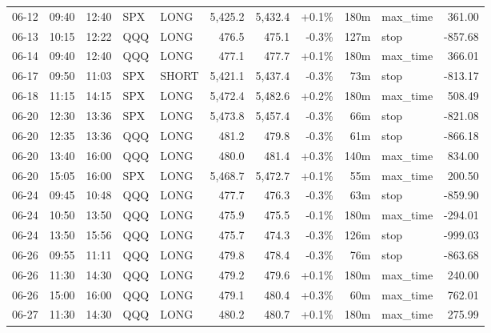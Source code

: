 \documentclass[11pt,a4paper,twoside]{article}
\begin{document}
\begin{center}
\begin{longtable}{>{\color{txtmain}}l l l l l r r r r >{\color{txtmain}}l r}
06-12 & 09:40 & 12:40 & SPX & LONG & 5,425.2 & 5,432.4 & \textcolor{wingreen}{+0.1\%} & 180m & max\_time & \textcolor{wingreen}{361.00} \\
06-13 & 10:15 & 12:22 & QQQ & LONG & 476.5 & 475.1 & \textcolor{lossred}{-0.3\%} & 127m & stop & \textcolor{lossred}{-857.68} \\
06-14 & 09:40 & 12:40 & QQQ & LONG & 477.1 & 477.7 & \textcolor{wingreen}{+0.1\%} & 180m & max\_time & \textcolor{wingreen}{366.01} \\
06-17 & 09:50 & 11:03 & SPX & SHORT & 5,421.1 & 5,437.4 & \textcolor{lossred}{-0.3\%} & 73m & stop & \textcolor{lossred}{-813.17} \\
06-18 & 11:15 & 14:15 & SPX & LONG & 5,472.4 & 5,482.6 & \textcolor{wingreen}{+0.2\%} & 180m & max\_time & \textcolor{wingreen}{508.49} \\
06-20 & 12:30 & 13:36 & SPX & LONG & 5,473.8 & 5,457.4 & \textcolor{lossred}{-0.3\%} & 66m & stop & \textcolor{lossred}{-821.08} \\
06-20 & 12:35 & 13:36 & QQQ & LONG & 481.2 & 479.8 & \textcolor{lossred}{-0.3\%} & 61m & stop & \textcolor{lossred}{-866.18} \\
06-20 & 13:40 & 16:00 & QQQ & LONG & 480.0 & 481.4 & \textcolor{wingreen}{+0.3\%} & 140m & max\_time & \textcolor{wingreen}{834.00} \\
06-20 & 15:05 & 16:00 & SPX & LONG & 5,468.7 & 5,472.7 & \textcolor{wingreen}{+0.1\%} & 55m & max\_time & \textcolor{wingreen}{200.50} \\
06-24 & 09:45 & 10:48 & QQQ & LONG & 477.7 & 476.3 & \textcolor{lossred}{-0.3\%} & 63m & stop & \textcolor{lossred}{-859.90} \\
06-24 & 10:50 & 13:50 & QQQ & LONG & 475.9 & 475.5 & \textcolor{lossred}{-0.1\%} & 180m & max\_time & \textcolor{lossred}{-294.01} \\
06-24 & 13:50 & 15:56 & QQQ & LONG & 475.7 & 474.3 & \textcolor{lossred}{-0.3\%} & 126m & stop & \textcolor{lossred}{-999.03} \\
06-26 & 09:55 & 11:11 & QQQ & LONG & 479.8 & 478.4 & \textcolor{lossred}{-0.3\%} & 76m & stop & \textcolor{lossred}{-863.68} \\
06-26 & 11:30 & 14:30 & QQQ & LONG & 479.2 & 479.6 & \textcolor{wingreen}{+0.1\%} & 180m & max\_time & \textcolor{wingreen}{240.00} \\
06-26 & 15:00 & 16:00 & QQQ & LONG & 479.1 & 480.4 & \textcolor{wingreen}{+0.3\%} & 60m & max\_time & \textcolor{wingreen}{762.01} \\
06-27 & 11:30 & 14:30 & QQQ & LONG & 480.2 & 480.7 & \textcolor{wingreen}{+0.1\%} & 180m & max\_time & \textcolor{wingreen}{275.99} \\

\end{longtable}
\end{center}
\end{document}

